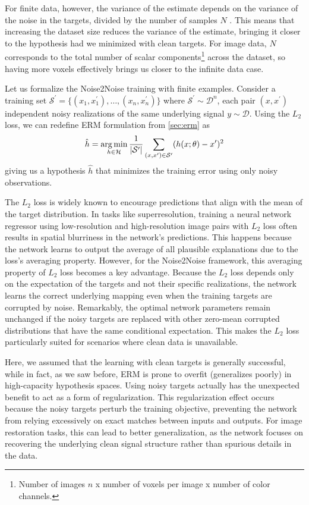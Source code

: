 For finite data, however, the variance of the estimate depends on the variance of the noise in the targets, divided by the number of samples $N$ \cite[supplementary~material]{lehtinenNoise2NoiseLearningImage2018}. This means that increasing the dataset size reduces the variance of the estimate, bringing it closer to the hypothesis had we minimized with clean targets. For image data, $N$ corresponds to the total number of scalar components\footnote{Number of images $n$ x number of voxels per image x number of color channels.} across the dataset, so having more voxels effectively brings us closer to the infinite data case.

Let us formalize the Noise2Noise training with finite examples. Consider a training set $\mathcal{S}^\prime = \{(x_1, x_1^\prime), \dots, (x_n, x_n^\prime)\}$ where $\mathcal{S}^\prime \sim \mathcal{D}^n$, each pair $(x, x^\prime)$ independent noisy realizations of the same underlying signal $y \sim \mathcal{D}$. Using the $L_2$ loss, we can redefine \gls{ERM} formulation from \cref{sec:erm} as
\begin{equation}\label{eq:erm-noise2noise}
    \hat{h} = \operatorname*{arg\,min}_{h \in \mathcal{H}} \frac{1}{\lvert \mathcal{S^\prime} \rvert} \sum_{(x, x^\prime) \in \mathcal{S}^\prime} (h(x; \theta) - x^\prime)^2
\end{equation}
giving us a hypothesis $\hat{h}$ that minimizes the training error using only noisy observations.


The $L_2$ loss is widely known to encourage predictions that align with the mean of the target distribution. In tasks like superresolution, training a neural network regressor using low-resolution and high-resolution image pairs with $L_2$ loss often results in spatial blurriness in the network’s predictions. This happens because the network learns to output the average of all plausible explanations due to the loss’s averaging property. However, for the Noise2Noise framework, this averaging property of $L_2$ loss becomes a key advantage. Because the $L_2$ loss depends only on the expectation of the targets and not their specific realizations, the network learns the correct underlying mapping even when the training targets are corrupted by noise. Remarkably, the optimal network parameters remain unchanged if the noisy targets are replaced with other zero-mean corrupted distributions that have the same conditional expectation. This makes the $L_2$ loss particularly suited for scenarios where clean data is unavailable.

Here, we assumed that the learning with clean targets is generally successful, while in fact, as we saw before, \gls{ERM} is prone to overfit (generalizes poorly) in high-capacity hypothesis spaces. Using noisy targets actually has the unexpected benefit to act as a form of regularization. This regularization effect occurs because the noisy targets perturb the training objective, preventing the network from relying excessively on exact matches between inputs and outputs. For image restoration tasks, this can lead to better generalization, as the network focuses on recovering the underlying clean signal structure rather than spurious details in the data.



